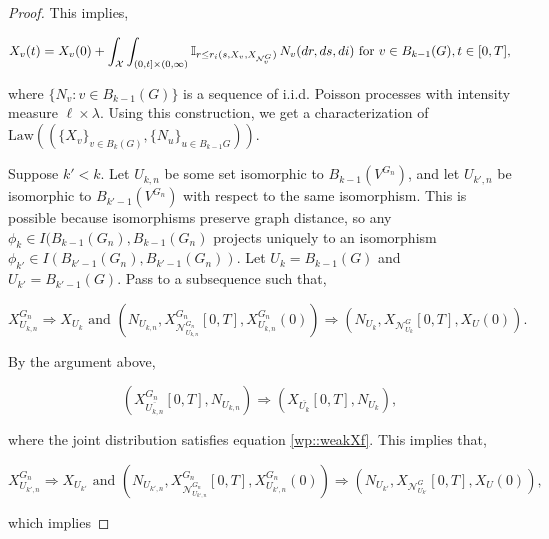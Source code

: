\documentclass[12pt]{article}
\newcommand{\mb}{\mathbb}
\newcommand{\mc}{\mathcal}
\newcommand{\ov}{\overline}
\newcommand{\te}{\text}
\newcommand{\ind}{\hspace{24pt}}
\newcommand{\sta}{\mc{X}}							%
\newcommand{\gneigh}[2]{\mc{N}^{#1}_{#2}}			%
\newcommand{\cl}[1]{\ov{#1}}						%
\newcommand{\Xf}{X}									%
\newcommand{\poiss}{N}								%
\newcommand{\leb}{\lambda}							%
\newcommand{\Sm}{\ell}								%
\newcommand{\rate}{r}								%
\newcommand{\poissv}[1]{_{#1}}						%
\newcommand{\vind}[1]{_{#1}}						%
\newcommand{\tme}[1]{(#1)}							%
\newcommand{\tmi}[1]{#1}							%
\newcommand{\gind}[1]{^{#1}}						%
\newcommand{\stpara}[1]{_{#1}}						%
\newcommand{\tmepro}[3]{
\ifstrempty{#3}{
	(#1,#2)}{
	(#1,#2,#3)}}									%
\newcommand{\trnc}[1]{B_{#1}}						%
\newcommand{\dit}[2]{_{#1,#2}}						%
\newcommand{\law}{\te{Law}}							%
\renewcommand{\it}[1]{_{#1}}						%
\begin{document}
\begin{proof}
This implies,

\begin{equation}
\Xf\vind{v}\tme{t} = \Xf\vind{v}\tme{0} + \int_\sta\int_{(0,t]\times (0,\infty)} \mb{I}_{r \leq \rate\stpara{i}\tmepro{s}{\Xf\vind{v}}{\Xf\vind{\gneigh{G}{v}}}}\,\poiss\poissv{v}(dr,ds,di) \te{ for } v \in \trnc{k-1}(G), t \in [0,T],
\label{wp::weakXf}
\end{equation}

where \(\{\poiss\poissv{v}: v \in \trnc{k-1}(G)\}\) is a sequence of i.i.d. Poisson processes with intensity measure \(\Sm\times \leb\). Using this construction, we get a characterization of \(\law\left(\left(\{\Xf\vind{v}\}_{v \in \trnc{k}(G)},\{\poiss\poissv{u}\}_{u \in \trnc{k-1}{G}}\right)\right)\).

\ind Suppose \(k' < k\). Let \(U\dit{k}{n}\) be some set isomorphic to \(\trnc{k-1}(V\gind{G\it{n}})\), and let \(U\dit{k'}{n}\) be isomorphic to \(\trnc{k'-1}(V\gind{G\it{n}})\) with respect to the same isomorphism. This is possible because isomorphisms preserve graph distance, so any \(\phi\it{k} \in I(\trnc{k-1}(G\it{n}),\trnc{k-1}(G\it{n})\) projects uniquely to an isomorphism \(\phi\it{k'} \in I\left(\trnc{k'-1}(G\it{n}),\trnc{k'-1}(G\it{n})\right)\). Let \(U\it{k} = \trnc{k-1}(G)\) and \(U\it{k'} = \trnc{k'-1}(G)\). Pass to a subsequence such that,

\[\Xf\gind{G\it{n}}\vind{U\dit{k}{n}} \Rightarrow \Xf\vind{U\it{k}}\te{ and } \left(\poiss\vind{U\dit{k}{n}},\Xf\gind{G\it{n}}\vind{\gneigh{G\it{n}}{U\dit{k}{n}}}\tmi{[0,T]},\Xf\gind{G\it{n}}\vind{U\dit{k}{n}}\tme{0}\right) \Rightarrow \left(\poiss\vind{U\it{k}},\Xf\vind{\gneigh{G}{U\it{k}}}\tmi{[0,T]},\Xf\vind{U}\tme{0}\right).\]

By the argument above,

\[\left(\Xf\gind{G\it{n}}\vind{\cl{U\dit{k}{n}}}\tmi{[0,T]},\poiss\poissv{U\dit{k}{n}}\right)\Rightarrow \left(\Xf\vind{\cl{U\it{k}}}\tmi{[0,T]},\poiss\poissv{U\it{k}}\right),\]

where the joint distribution satisfies equation \eqref{wp::weakXf}. This implies that,

\[\Xf\gind{G\it{n}}\vind{U\dit{k'}{n}} \Rightarrow \Xf\vind{U\it{k'}}\te{ and } \left(\poiss\vind{U\dit{k'}{n}},\Xf\gind{G\it{n}}\vind{\gneigh{G\it{n}}{U\dit{k'}{n}}}\tmi{[0,T]},\Xf\gind{G\it{n}}\vind{U\dit{k'}{n}}\tme{0}\right) \Rightarrow \left(\poiss\vind{U\it{k'}},\Xf\vind{\gneigh{G}{U\it{k'}}}\tmi{[0,T]},\Xf\vind{U}\tme{0}\right),\]

which implies


\end{proof}
\end{document}

